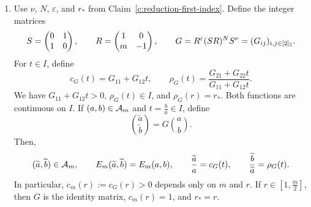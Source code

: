 \begin{lemma}
\begin{enumerate}
\item\label{c:reduction-word-scale} Use $\nu$, $N$, $\varepsilon$, and $r_*$ from Claim~\ref{c:reduction-first-index}. Define the integer matrices
\[
S=\begin{pmatrix}0&1\\1&0\end{pmatrix},\qquad
R=\begin{pmatrix}1&0\\m&-1\end{pmatrix},\qquad
G=R^\varepsilon(SR)^N S^\nu=(G_{ij})_{i,j\in[2]_{\mathbb Z}}.
\]
For $t\in I$, define
\begin{equation}\label{eq:reduction-scale-map}
c_G(t)=G_{11}+G_{12}t,\qquad
\rho_G(t)=\frac{G_{21}+G_{22}t}{G_{11}+G_{12}t}.
\end{equation}
We have $G_{11}+G_{12}t>0$, $\rho_G(t)\in I$, and $\rho_G(r)=r_*$. Both functions are continuous on $I$. If $(a,b)\in\mathcal A_m$ and $t=\frac ba\in I$, define
\[
\binom{\widetilde a}{\widetilde b}=G\binom ab.
\]
Then,
\[
(\widetilde a,\widetilde b)\in\mathcal A_m,\qquad
E_m(\widetilde a,\widetilde b)=E_m(a,b),\qquad
\frac{\widetilde a}{a}=c_G(t),\qquad
\frac{\widetilde b}{\widetilde a}=\rho_G(t).
\]
In particular, $c_m(r):=c_G(r)>0$ depends only on $m$ and $r$. If $r\in[1,\frac m2]$, then $G$ is the identity matrix, $c_m(r)=1$, and $r_*=r$.
\end{enumerate}
\end{lemma}
